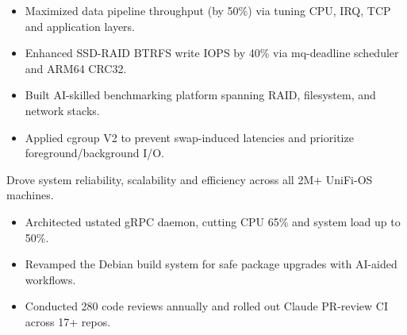 \begin{cventries}
{\begin{cvitems}
\begin{itemize}
          \item {
            Maximized data pipeline throughput (by 50\%) via tuning CPU, IRQ,
            TCP and application layers.
          }
          \item {
            Enhanced SSD-RAID BTRFS write IOPS by 40\% via mq-deadline scheduler and ARM64 CRC32.
          }
          \item {
            Built AI-skilled benchmarking platform spanning RAID, filesystem,
            and network stacks.
          }
          \item {
            Applied cgroup V2 to prevent swap-induced latencies and prioritize foreground/background I/O.
          }
          \end{itemize}
        \item {
          Drove system reliability, scalability and efficiency across all 2M+ UniFi-OS machines.
          }
          \begin{itemize}
          \item {
            Architected ustated gRPC daemon, cutting CPU 65\% and system load up to 50\%.
          }
          \item {
            Revamped the Debian build system for safe package upgrades with AI-aided workflows.
          }
          \item {
            Conducted 280 code reviews annually and rolled out Claude PR-review CI across 17+ repos.
          }
          \end{itemize}
      \end{cvitems}
    }


\end{cventries}
